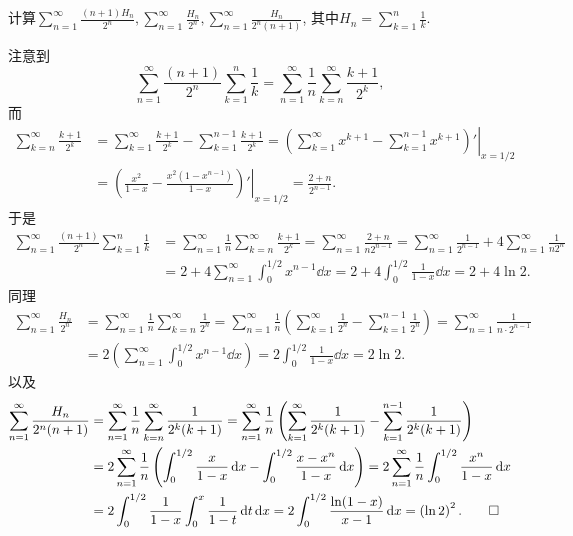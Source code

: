 \begin{quiza}
\begin{solution}
\end{solution}
\woe 计算\(\sum_{n=1}^{\infty}\frac{(n+1)H_n}{2^n},\sum_{n=1}^{\infty}\frac{H_n}{2^n},\sum_{n=1}^{\infty}\frac{H_n}{2^n(n+1)}\), 其中\(H_n=\sum_{k=1}^{n}\frac{1}{k}\).
\begin{solution}
注意到\[\sum_{n=1}^{\infty}\frac{(n+1)}{2^n}\sum_{k=1}^{n}\frac{1}{k}=\sum_{n=1}^{\infty}\frac{1}{n}\sum_{k=n}^{\infty}\frac{k+1}{2^k},\]而\[\begin{split}
\sum_{k=n}^{\infty}\frac{k+1}{2^k}&=\sum_{k=1}^{\infty}\frac{k+1}{2^k}-\sum_{k=1}^{n-1}\frac{k+1}{2^k}=\left.\left(\sum_{k=1}^{\infty}x^{k+1}-\sum_{k=1}^{n-1}x^{k+1}\right)'\right|_{x=1/2}\\&=\left.\left(\frac{x^2}{1-x}-\frac{x^2(1-x^{n-1})}{1-x}\right)'\right|_{x=1/2}=\frac{2+n}{2^{n-1}}.
\end{split}\]于是\[\begin{split}
\sum_{n=1}^{\infty}\frac{(n+1)}{2^n}\sum_{k=1}^{n}\frac{1}{k}&=\sum_{n=1}^{\infty}\frac{1}{n}\sum_{k=n}^{\infty}\frac{k+1}{2^k}=\sum_{n=1}^{\infty}\frac{2+n}{n2^{n-1}}=\sum_{n=1}^{\infty}\frac{1}{2^{n-1}}+4\sum_{n=1}^{\infty}\frac{1}{n2^n}\\&=2+4\sum_{n=1}^{\infty}\int_{0}^{1/2}x^{n-1}\dd x=2+4\int_{0}^{1/2}\frac{1}{1-x}\dd x=2+4\ln 2.
\end{split}\]
同理\[\begin{split}
\sum_{n=1}^{\infty}\frac{H_n}{2^n}&=\sum_{n=1}^{\infty}\frac{1}{n}\sum_{k=n}^{\infty}\frac{1}{2^n}=\sum_{n=1}^{\infty}\frac{1}{n}\left(\sum_{k=1}^{\infty}\frac{1}{2^n}-\sum_{k=1}^{n-1}\frac{1}{2^n}\right)=\sum_{n=1}^{\infty}\frac{1}{n\cdot 2^{n-1}}\\&=2\left(\sum_{n=1}^{\infty}\int_{0}^{1/2}x^{n-1}\dd x\right)=2\int_{0}^{1/2}\frac{1}{1-x}\dd x=2\ln 2.\end{split}\]以及\[\begin{split}
\sum_{n=1}^{\infty}\frac{H_n}{2^n(n+1)}&=\sum_{n=1}^{\infty}\frac{1}{n}\sum_{k=n}^{\infty}\frac{1}{2^k(k+1)}=\sum_{n=1}^{\infty}\frac{1}{n}\left(\sum_{k=1}^{\infty}\frac{1}{2^k(k+1)}-\sum_{k=1}^{n-1}\frac{1}{2^k(k+1)}\right)\\&=2\sum_{n=1}^{\infty}\frac{1}{n}\left(\int_{0}^{1/2}\frac{x}{1-x}\,\mathrm{d} x-\int_{0}^{1/2}\frac{x-x^n}{1-x}\,\mathrm{d} x\right)=2\sum_{n=1}^{\infty}\frac{1}{n}\int_{0}^{1/2}\frac{x^n}{1-x}\,\mathrm{d} x\\&=2\int_{0}^{1/2}\frac{1}{1-x}\int_{0}^{x}\frac{1}{1-t}\,\mathrm{d} t\,\mathrm{d} x=2\int_{0}^{1/2}\frac{\ln (1-x)}{x-1}\,\mathrm{d} x=\left(\ln 2\right)^2.\qedhere\end{split}\]
\end{solution}

\end{quiza}

